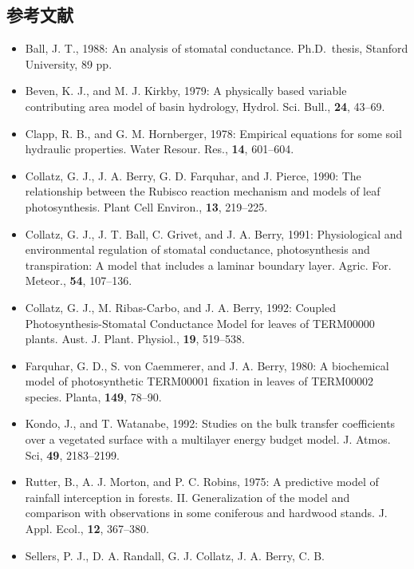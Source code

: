 \hypertarget{ux53c2ux8003ux6587ux732e}{%
\subsection{参考文献}\label{ux53c2ux8003ux6587ux732e}}

\begin{itemize}
\item
  Ball, J. T., 1988: An analysis of stomatal conductance. Ph.D.~thesis,
  Stanford University, 89 pp.
\item
  Beven, K. J., and M. J. Kirkby, 1979: A physically based variable
  contributing area model of basin hydrology, {Hydrol. Sci. Bull.},
  {\textbf{24}}, 43--69.
\item
  Clapp, R. B., and G. M. Hornberger, 1978: Empirical equations for some
  soil hydraulic properties. {Water Resour. Res.}, {\textbf{14}},
  601--604.
\item
  Collatz, G. J., J. A. Berry, G. D. Farquhar, and J. Pierce, 1990: The
  relationship between the Rubisco reaction mechanism and models of leaf
  photosynthesis. {Plant Cell Environ.}, {\textbf{13}}, 219--225.
\item
  Collatz, G. J., J. T. Ball, C. Grivet, and J. A. Berry, 1991:
  Physiological and environmental regulation of stomatal conductance,
  photosynthesis and transpiration: A model that includes a laminar
  boundary layer. {Agric. For. Meteor.}, {\textbf{54}}, 107--136.
\item
  Collatz, G. J., M. Ribas-Carbo, and J. A. Berry, 1992: Coupled
  Photosynthesis-Stomatal Conductance Model for leaves of TERM00000
  plants. {Aust. J. Plant. Physiol.}, {\textbf{19}}, 519--538.
\item
  Farquhar, G. D., S. von Caemmerer, and J. A. Berry, 1980: A
  biochemical model of photosynthetic TERM00001 fixation in leaves of
  TERM00002 species. {Planta}, {\textbf{149}}, 78--90.
\item
  Kondo, J., and T. Watanabe, 1992: Studies on the bulk transfer
  coefficients over a vegetated surface with a multilayer energy budget
  model. {J. Atmos. Sci}, {\textbf{49}}, 2183--2199.
\item
  Rutter, B., A. J. Morton, and P. C. Robins, 1975: A predictive model
  of rainfall interception in forests. II. Generalization of the model
  and comparison with observations in some coniferous and hardwood
  stands. {J. Appl. Ecol.}, {\textbf{12}}, 367--380.
\item
  Sellers, P. J., D. A. Randall, G. J. Collatz, J. A. Berry, C. B.

\end{itemize}
